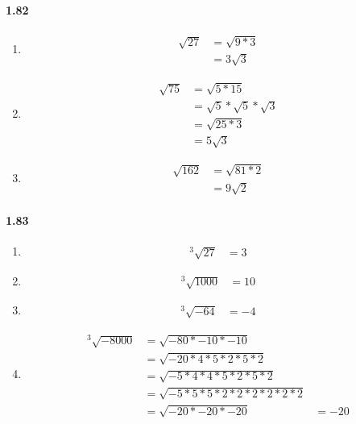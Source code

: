 \documentclass{article}
\newcommand\litem[1]{\item{\bfseries#1\space}}
\begin{document}
\paragraph{1.82}
\begin{enumerate}[label=\emph{\alph*})]
\litem{
\begin{align*}
  \sqrt{27} &= \sqrt{9 * 3} \\
  &= 3 \sqrt{3}
\end{align*}
}
\litem{
\begin{align*}
  \sqrt{75} &= \sqrt{5 * 15} \\
  &= \sqrt{5} * \sqrt{5} * \sqrt{3} \\
  &= \sqrt{25 * 3} \\
  &= 5\sqrt{3}
\end{align*}
}
\litem{
\begin{align*}
  \sqrt{162} &= \sqrt{81 * 2} \\
  &= 9\sqrt{2}
\end{align*}
}
\end{enumerate}

\paragraph{1.83}
\begin{enumerate}[label=\emph{\alph*})]
\litem{
\begin{align*}
  ^3\sqrt{27} &= 3 
\end{align*}
}
\litem{
\begin{align*}
  ^3\sqrt{1000} &= 10
\end{align*}
}
\litem{
\begin{align*}
  ^3\sqrt{-64} &= -4 
\end{align*}
}
\litem{
\begin{align*}
  ^3\sqrt{-8000} &= \sqrt{-80 * -10 * -10} \\
  &= \sqrt{-20 * 4 * 5 * 2 * 5 * 2} \\
  &= \sqrt{-5 * 4 * 4 * 5 * 2 * 5 * 2} \\
  &= \sqrt{-5 * 5 * 5 * 2 * 2 * 2 * 2 * 2 * 2} \\
  &= \sqrt{-20 * -20 * -20}
  &= -20
\end{align*}
}
\end{enumerate}
\end{document}
